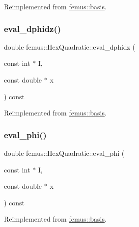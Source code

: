 Reimplemented from \mbox{\hyperlink{classfemus_1_1basis_a2819fac9aae797156b9efec8a0b85cc1}{femus\+::basis}}.

\mbox{\label{classfemus_1_1_hex_quadratic_ab75b6c916ae7176fa525bdd6d8bd37c4}} 
\subsubsection{\texorpdfstring{eval\+\_\+dphidz()}{eval\_dphidz()}}
{\footnotesize\ttfamily double femus\+::\+Hex\+Quadratic\+::eval\+\_\+dphidz (\begin{DoxyParamCaption}\item[{const int $\ast$}]{I,  }\item[{const double $\ast$}]{x }\end{DoxyParamCaption}) const\hspace{0.3cm}{\ttfamily [virtual]}}



Reimplemented from \mbox{\hyperlink{classfemus_1_1basis_affd9927f6e25e264108219d862b8cb3d}{femus\+::basis}}.

\mbox{\label{classfemus_1_1_hex_quadratic_a2e62701d96977559bfbdbc449c93fc3b}} 
\subsubsection{\texorpdfstring{eval\+\_\+phi()}{eval\_phi()}}
{\footnotesize\ttfamily double femus\+::\+Hex\+Quadratic\+::eval\+\_\+phi (\begin{DoxyParamCaption}\item[{const int $\ast$}]{I,  }\item[{const double $\ast$}]{x }\end{DoxyParamCaption}) const\hspace{0.3cm}{\ttfamily [virtual]}}



Reimplemented from \mbox{\hyperlink{classfemus_1_1basis_a89b0797cdccffae5ff6d059b32016ae5}{femus\+::basis}}.

